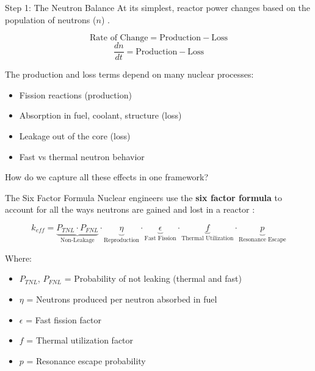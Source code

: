 \documentclass[aspectratio=169]{beamer}
\begin{document}
\begin{frame}[allowframebreaks]{Step 1: The Neutron Balance}
    At its simplest, reactor power changes based on the population of neutrons ($n$) \cite{bell1970nuclear}.

    $$ \text{Rate of Change} = \text{Production} - \text{Loss} $$
    $$ \frac{dn}{dt} = \text{Production} - \text{Loss} $$

    \vspace{1em}
    The production and loss terms depend on many nuclear processes:
    \begin{itemize}
        \item Fission reactions (production)
        \item Absorption in fuel, coolant, structure (loss)
        \item Leakage out of the core (loss)
        \item Fast vs thermal neutron behavior
    \end{itemize}

    \vspace{1em}
    How do we capture all these effects in one framework?
\end{frame}

\begin{frame}[allowframebreaks]{The Six Factor Formula}
    Nuclear engineers use the \textbf{six factor formula} to account for all the ways neutrons are gained and lost in a reactor \cite{lamarsh2001introduction}:

    $$ k_{eff} = \underbrace{P_{TNL} \cdot P_{FNL}}_{\text{Non-Leakage}} \cdot \underbrace{\eta}_{\text{Reproduction}} \cdot \underbrace{\epsilon}_{\text{Fast Fission}} \cdot \underbrace{f}_{\text{Thermal Utilization}} \cdot \underbrace{p}_{\text{Resonance Escape}} $$

    \vspace{1em}
    Where:
    \begin{itemize}
        \item $P_{TNL}$, $P_{FNL}$ = Probability of not leaking (thermal and fast)
        \item $\eta$ = Neutrons produced per neutron absorbed in fuel
        \item $\epsilon$ = Fast fission factor
        \item $f$ = Thermal utilization factor
        \item $p$ = Resonance escape probability
    \end{itemize}
\end{frame}
\end{document}

